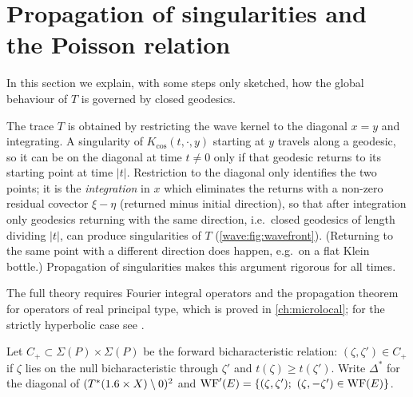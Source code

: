 \section{Propagation of singularities and the Poisson relation}\label{wave:sec:poisson}

In this section we explain, with some steps only sketched, how the global
behaviour of $T$ is governed by closed geodesics.

\begin{discussion}
The trace $T$ is obtained by restricting the wave kernel to the diagonal $x=y$ and
integrating. A singularity of $K_{\cos}(t,\cdot,y)$ starting at $y$ travels along a
geodesic, so it can be on the diagonal at time $t\ne0$ only if that geodesic returns
to its starting point at time $|t|$. Restriction to the diagonal only identifies the
two points; it is the \emph{integration} in $x$ which eliminates the returns with a
non-zero residual covector $\xi-\eta$ (returned minus initial direction), so that after
integration only geodesics returning with the same direction, i.e.\ closed geodesics of
length dividing $|t|$, can produce singularities of $T$ (\cref{wave:fig:wavefront}).
(Returning to the same point with a different direction does happen, e.g.\ on a flat
Klein bottle.) Propagation of singularities makes this
argument rigorous for all times.
\end{discussion} The full theory requires Fourier
integral operators \cite{Hormander-FIO} and the propagation theorem for operators of
real principal type, which is proved in \cref{ch:microlocal}; for the strictly hyperbolic case see
\cite[Chapter~XXIII]{Hormander-III}.

Let $C_+\subset\Sigma(P)\times\Sigma(P)$ be the forward bicharacteristic relation:
$(\zeta,\zeta')\in C_+$ if $\zeta$ lies on the null bicharacteristic through $\zeta'$ and
$t(\zeta)\ge t(\zeta')$. Write $\Delta^*$ for the diagonal of
$(T^*(1.6\times X)\setminus0)^2$ and $\WFp(E)=\{(\zeta,\zeta');\ (\zeta,-\zeta')\in\WF(E)\}$.

